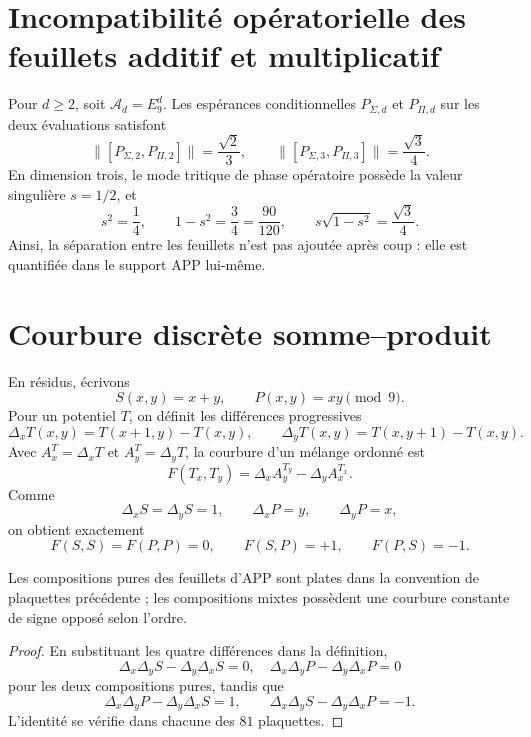 \section{Incompatibilité opératorielle des feuillets additif et multiplicatif}

Pour \(d\ge2\), soit \(\mathscr A_d=E_9^d\). Les espérances conditionnelles \(P_{\Sigma,d}\) et \(P_{\Pi,d}\) sur les deux évaluations satisfont
\[
 \|[P_{\Sigma,2},P_{\Pi,2}]\|=\frac{\sqrt2}{3},
 \qquad
 \|[P_{\Sigma,3},P_{\Pi,3}]\|=\frac{\sqrt3}{4}.
\]
En dimension trois, le mode tritique de phase opératoire possède la valeur singulière \(s=1/2\), et
\[
 s^2=\frac14,\qquad 1-s^2=\frac34=\frac{90}{120},
 \qquad s\sqrt{1-s^2}=\frac{\sqrt3}{4}.
\]
Ainsi, la séparation entre les feuillets n'est pas ajoutée après coup : elle est quantifiée dans le support APP lui-même.

\section{Courbure discrète somme--produit}

En résidus, écrivons
\[
 S(x,y)=x+y,\qquad P(x,y)=xy\pmod9.
\]
Pour un potentiel \(T\), on définit les différences progressives
\[
 \Delta_xT(x,y)=T(x+1,y)-T(x,y),\qquad
 \Delta_yT(x,y)=T(x,y+1)-T(x,y).
\]
Avec \(A_x^T=\Delta_xT\) et \(A_y^T=\Delta_yT\), la courbure d'un mélange ordonné est
\[
 F(T_x,T_y)=\Delta_xA_y^{T_y}-\Delta_yA_x^{T_x}.
\]
Comme
\[
 \Delta_xS=\Delta_yS=1,\qquad
 \Delta_xP=y,\qquad \Delta_yP=x,
\]
on obtient exactement
\begin{equation}
 F(S,S)=F(P,P)=0,\qquad
 F(S,P)=+1,\qquad F(P,S)=-1.
 \label{espiral:eq:curvatura-mixta-app}
\end{equation}

\begin{theorem}
Les compositions pures des feuillets d'APP sont plates dans la convention de plaquettes précédente ; les compositions mixtes possèdent une courbure constante de signe opposé selon l'ordre.
\end{theorem}
\begin{proof}
En substituant les quatre différences dans la définition,
\[
 \Delta_x\Delta_yS-\Delta_y\Delta_xS=0,
 \quad
 \Delta_x\Delta_yP-\Delta_y\Delta_xP=0
\]
pour les deux compositions pures, tandis que
\[
 \Delta_x\Delta_yP-\Delta_y\Delta_xS=1,
 \qquad
 \Delta_x\Delta_yS-\Delta_y\Delta_xP=-1.
\]
L'identité se vérifie dans chacune des \(81\) plaquettes.
\end{proof}

